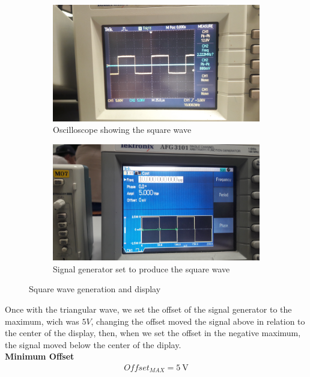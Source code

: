 \documentclass[letterpaper]{article}
\begin{document}
\begin{figure}[H]
    \begin{subfigure}{0.55\textwidth}
        \includegraphics[width=.95\linewidth]{img/part2/11}
        \caption{Oscilloscope showing the square wave}
    \end{subfigure}
    \begin{subfigure}{0.55\textwidth}
        \includegraphics[width=.95\linewidth]{img/part2/10}
        \caption{Signal generator set to produce the square wave}
    \end{subfigure}
    \caption{Square wave generation and display}
\end{figure}
Once with the triangular wave, we set the offset of the signal generator to the maximum, wich
was $5 V$, changing the offset moved the signal above in relation to the center of the display, then, when
we set the offset in the negative maximum, the signal moved below the center of the diplay.\\
{\textbf{Minimum Offset}}
\begin{gather*}
    Offset_{MAX} = \SI{5}{\volt}
\end{gather*}
\end{document}
